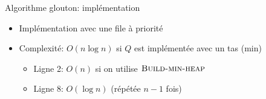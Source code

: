 \begin{frame}{Algorithme glouton: implémentation}

\begin{center}
{\small
{}
}
\end{center}

\bigskip

\begin{itemize}
\item Implémentation avec une file à priorité
\item Complexité: $O(n\log n)$ si $Q$ est implémentée avec un tas (min)
\begin{itemize}
\item Ligne 2: $O(n)$ si on utilise $\textnormal{\scshape Build-min-heap}$
\item Ligne 8: $O(\log n)$ (répétée $n-1$ fois)
\end{itemize}
\end{itemize}

\end{frame}



